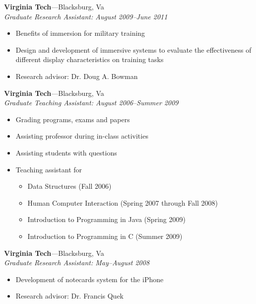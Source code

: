 \documentclass[wideaddress]{vitae}
\let\olditem\item
\def\item{\nopagebreak[4]\olditem}%
\newcommand{\ressubitem}[1]{
	\item \begin{flushleft} #1 \end{flushleft}
}
\newcommand{\resbigitem}[3]{
	\item
	\textbf{#1}---#2 \\
	\textit{#3}
}
\newenvironment{ressubsec}[3]{
	\resbigitem{#1}{#2}{#3}
	\begin{itemize}
}{
	\end{itemize}
}
\begin{document}
\begin{description}
	\begin{ressubsec}{Virginia Tech}{Blacksburg, Va}{Graduate Research Assistant: August 2009--June 2011}
		\ressubitem{Benefits of immersion for military training}
		\ressubitem{Design and development of immersive systems to evaluate the effectiveness of different display characteristics on training tasks}
		\ressubitem{Research advisor: Dr. Doug A. Bowman}
	\end{ressubsec}

	\begin{ressubsec}{Virginia Tech}{Blacksburg, Va}{Graduate Teaching Assistant: August 2006--Summer 2009}
		\ressubitem{Grading programs, exams and papers}
		\ressubitem{Assisting professor during in-class activities}
		\ressubitem{Assisting students with questions}
		\ressubitem{Teaching assistant for}
		\begin{itemize}
			\ressubitem{Data Structures (Fall 2006)}
			\ressubitem{Human Computer Interaction (Spring 2007 through Fall 2008)}
			\ressubitem{Introduction to Programming in Java (Spring 2009)}
			\ressubitem{Introduction to Programming in C (Summer 2009)}
		\end{itemize}
	\end{ressubsec}

	\begin{ressubsec}{Virginia Tech}{Blacksburg, Va}{Graduate Research Assistant: May--August 2008}
		\ressubitem{Development of notecards system for the iPhone}
		\ressubitem{Research advisor: Dr. Francis Quek}
	\end{ressubsec}
\end{description}
\end{document}
